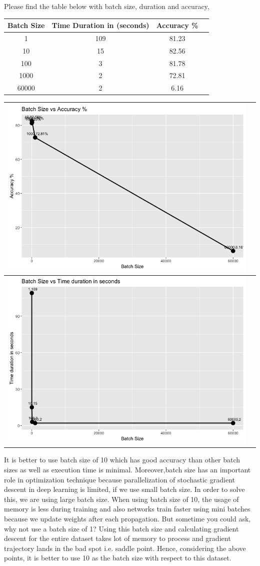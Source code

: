 \documentclass[a4paper,10pt]{article}
\begin{document}
Please find the table below with batch size, duration and accuracy,
\begin{center}
	\setlength{\arrayrulewidth}{1.0pt}
	\begin{tabular}{|c|c|c|c|}
		\hline
		 \textbf{Batch Size} & \textbf{Time Duration in (seconds)} & \textbf{Accuracy \%}\\ [1.5ex]
		\hline
		1 & 109 &81.23\\
		\hline
		10 & 15 &82.56\\
		\hline
		100 & 3 &81.78\\
		\hline
		1000 & 2 &72.81\\
		\hline
		60000 & 2 &6.16\\
		\hline
	\end{tabular}
\end{center} 
\begin{center}
	\setlength{\arrayrulewidth}{1.0pt}
	\begin{tabular}{|c|c|}
		\hline
		\includegraphics[width=.5\textwidth]{Batch_Size_Accuracy.png}\\
		\hline
		\includegraphics[width=.5\textwidth]{Batch_Size_Time.png}\\
		\hline
	\end{tabular}
\end{center}

It is better to use batch size of 10 which has good accuracy than other batch sizes as well as execution time is minimal.
Moreover,batch size has an important role in optimization technique because parallelization of stochastic gradient descent
in deep learning is limited, if we use small batch size. In order to solve this, we are using large batch size. When using
batch size of 10, the usage of memory is less during training and also networks train faster using mini batches because
we update weights after each propagation. But sometime you could ask, why not use a batch size of 1? Using this batch size and calculating
gradient descent for the entire dataset takes lot of memory to process and gradient trajectory lands in the bad spot i.e. saddle point.
Hence, considering the above points, it is better to use 10 as the batch size with respect to this dataset.
\end{document}
